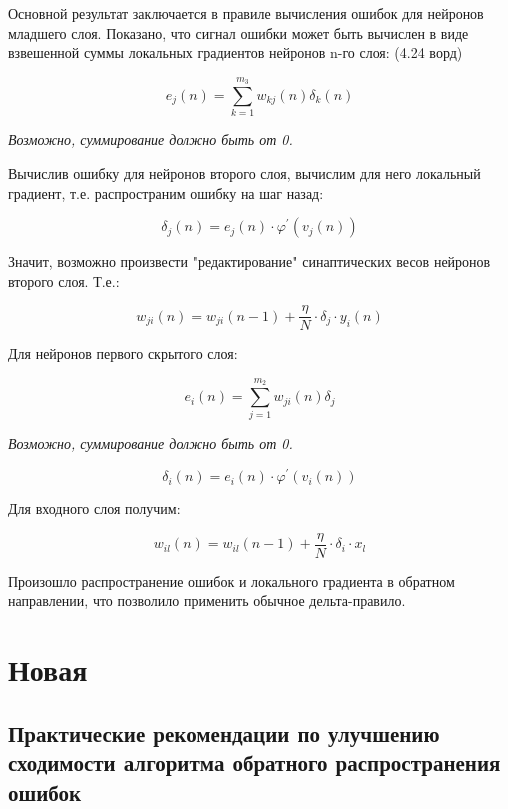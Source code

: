 \documentclass{article}
\begin{document}
Основной результат заключается в правиле вычисления ошибок для нейронов младшего слоя. 
Показано, что сигнал ошибки может быть вычислен в виде взвешенной суммы локальных градиентов
нейронов n-го слоя: (4.24 ворд)

\begin{equation}
    e_j(n) = \sum_{k=1}^{m_3} w_{kj}(n) \delta_k (n)
\end{equation}

\begin{myquote}
    \textit{Возможно, суммирование должно быть от 0.}
\end{myquote}

Вычислив ошибку для нейронов второго слоя, вычислим для него локальный градиент, т.е. 
распространим ошибку на шаг назад:

\begin{equation}
    \delta_j(n) = e_j(n) \cdot \varphi^{\prime} (v_j(n))
\end{equation}

Значит, возможно произвести "редактирование" синаптических весов нейронов второго слоя. Т.е.:

\begin{equation}
    w_{ji}(n) = w_{ji}(n-1) + \dfrac{\eta}{N} \cdot \delta_j \cdot y_i(n)
\end{equation}

Для нейронов первого скрытого слоя:

\begin{equation}
    e_i(n) = \sum_{j=1}^{m_2} w_{ji}(n) \delta_j
\end{equation}

\begin{myquote}
    \textit{Возможно, суммирование должно быть от 0.}
\end{myquote}

\begin{equation}
    \delta_i(n) = e_i(n) \cdot \varphi^{\prime} (v_i(n))
\end{equation}

Для входного слоя получим:

\begin{equation}
    w_{il}(n) = w_{il}(n-1) + \dfrac{\eta}{N} \cdot \delta_i \cdot x_l
\end{equation}

Произошло распространение ошибок и локального градиента в обратном направлении, что
позволило применить обычное дельта-правило.




\section{Новая}
\subsection{Практические рекомендации по улучшению сходимости алгоритма обратного распространения ошибок}
\end{document}
